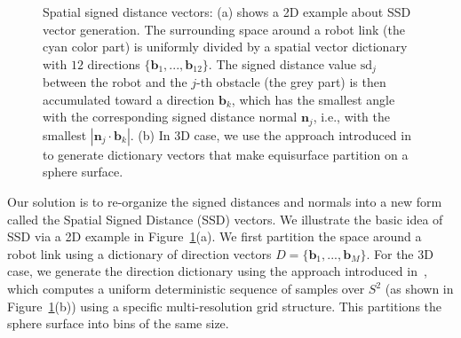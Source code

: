\documentclass[letterpaper, 10 pt, conference]{ieeeconf}  %
\begin{document}
\begin{figure}[!h]
\centering
{} \qquad
{}
\caption{Spatial signed distance vectors: (a) shows a 2D example about SSD vector generation. The surrounding space around a robot link (the cyan color part) is uniformly divided by a spatial vector dictionary with $12$ directions $\{\mathbf b_1, ..., \mathbf b_{12}\}$. The signed distance value $\text{sd}_j$ between the robot and the $j$-th obstacle (the grey part) is then accumulated toward a direction $\mathbf b_k$, which has the smallest angle with the corresponding signed distance normal $\mathbf n_j$, i.e., with the smallest $|\mathbf n_j \cdot \mathbf b_k|$. (b) In 3D case, we use the approach introduced in~\cite{Yershova:2010:GUI} to generate dictionary vectors that make equisurface partition on a sphere surface. }
\label{fig:trajectoryfeaturePD}
\end{figure}

Our solution is to re-organize the signed distances and normals into a new form called the Spatial Signed Distance (SSD) vectors. We illustrate the basic idea of SSD via a 2D example in Figure~\ref{fig:trajectoryfeaturePD}(a). We first partition the space around a robot link using a dictionary of direction vectors $D = \{\mathbf b_1, ..., \mathbf b_M\}$.  For the 3D case, we generate the direction dictionary using the approach introduced in~\cite{Yershova:2010:GUI}, which computes a uniform deterministic sequence of samples over $S^2$ (as shown in Figure~\ref{fig:trajectoryfeaturePD}(b)) using a specific multi-resolution grid structure.  This partitions the sphere surface into bins of the same size.
\end{document}
